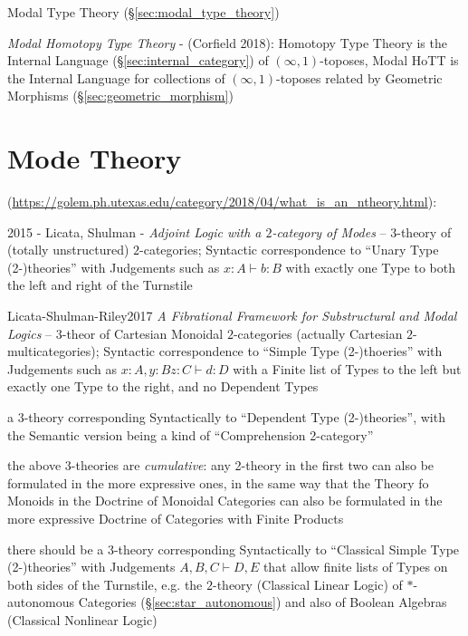 Modal Type Theory (\S\ref{sec:modal_type_theory})

\emph{Modal Homotopy Type Theory} - (Corfield 2018): Homotopy Type Theory is the
Internal Language (\S\ref{sec:internal_category}) of $(\infty,1)$-toposes, Modal
HoTT is the Internal Language for collections of $(\infty,1)$-toposes related by
Geometric Morphisms (\S\ref{sec:geometric_morphism})



\section{Mode Theory}\label{sec:mode_theory}

(\url{https://golem.ph.utexas.edu/category/2018/04/what_is_an_ntheory.html}):

2015 - Licata, Shulman - \emph{Adjoint Logic with a $2$-category of Modes} --
$3$-theory of (totally unstructured) $2$-categories; Syntactic correspondence
to ``Unary Type (2-)theories'' with Judgements such as $x : A \vdash b : B$
with exactly one Type to both the left and right of the Turnstile

Licata-Shulman-Riley2017 \emph{A Fibrational Framework for
  Substructural and Modal Logics}
-- $3$-theor of Cartesian Monoidal $2$-categories (actually Cartesian
$2$-multicategories); Syntactic correspondence to ``Simple Type (2-)thoeries''
with Judgements such as $x : A, y : B z : C \vdash d : D$ with a Finite list of
Types to the left but exactly one Type to the right, and no Dependent Types

a $3$-theory corresponding Syntactically to ``Dependent Type (2-)theories'',
with the Semantic version being a kind of ``Comprehension 2-category''

the above $3$-theories are \emph{cumulative}: any 2-theory in the first two can
also be formulated in the more expressive ones, in the same way that the Theory
fo Monoids in the Doctrine of Monoidal Categories can also be formulated in the
more expressive Doctrine of Categories with Finite Products

there should be a $3$-theory corresponding Syntactically to ``Classical Simple
Type (2-)theories'' with Judgements $A,B,C \vdash D,E$ that allow finite lists
of Types on both sides of the Turnstile, e.g. the $2$-theory (Classical Linear
Logic) of $*$-autonomous Categories (\S\ref{sec:star_autonomous}) and also of
Boolean Algebras (Classical Nonlinear Logic)

